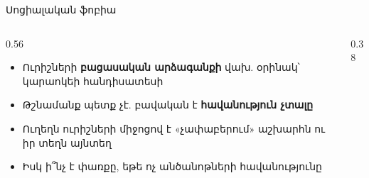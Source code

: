 \begin{frame}{Սոցիալական ֆոբիա}
  \begin{columns}[c]
    \begin{column}{0.56\textwidth}
      \begin{itemize}
        \item Ուրիշների \textbf{բացասական արձագանքի} վախ. օրինակ՝ կարաոկեի հանդիսատեսի
        \item<2-> Թշնամանք պետք չէ. բավական է \textbf{հավանություն չտալը}
        \item<3-> Ուղեղն ուրիշների միջոցով է «չափաբերում» աշխարհն ու իր տեղն այնտեղ
        \item<4-> Իսկ ի՞նչ է փառքը, եթե ոչ անծանոթների հավանությունը
      \end{itemize}
    \end{column}
    \begin{column}{0.38\textwidth}
      \centering
      \par\smallskip
    \end{column}
  \end{columns}
\end{frame}

